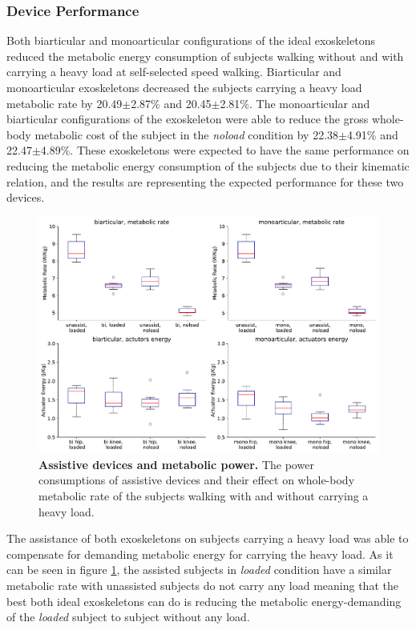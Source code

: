 \documentclass[10pt,letterpaper]{article}
\begin{document}
\subsubsection*{Device Performance}
Both biarticular and monoarticular configurations of the ideal exoskeletons reduced the metabolic energy consumption of subjects walking without and with carrying a heavy load at self-selected speed walking. Biarticular and monoarticular exoskeletons decreased the subjects carrying a heavy load metabolic rate by 20.49$\pm$2.87\% and 20.45$\pm$2.81\%. The monoarticular and biarticular configurations of the exoskeleton were able to reduce the gross whole-body metabolic cost of the subject in the \textit{noload} condition by 22.38$\pm$4.91\% and 22.47$\pm$4.89\%. These exoskeletons were expected to have the same performance on reducing the metabolic energy consumption of the subjects due to their kinematic relation, and the results are representing the expected performance for these two devices.\\
\begin{figure}[ht]   
	\centering
	\includegraphics[width=\linewidth]{Ideal_Exo_MonovsBi_Figures/Paper_Figure_Energy_BoxPlot.pdf}
	\vspace{1mm}
	\caption{\small{\textbf{Assistive devices and metabolic power.} The power consumptions of assistive devices and their effect on whole-body metabolic rate of the subjects walking with and without carrying a heavy load.}}
	\label{Fig_IdealExo_Energy_BoxPlot}
\end{figure}
The assistance of both exoskeletons on subjects carrying a heavy load was able to compensate for demanding metabolic energy for carrying the heavy load. As it can be seen in figure \ref{Fig_IdealExo_Energy_BoxPlot}, the assisted subjects in \textit{loaded} condition have a similar metabolic rate with unassisted subjects do not carry any load meaning that the best both ideal exoskeletons can do is reducing the metabolic energy-demanding of the \textit{loaded} subject to subject without any load.\\
\end{document}
